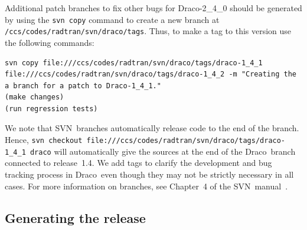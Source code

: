 \documentclass[note]{newmemo}
\newcommand{\draco}{{\normalfont\small\sffamily Draco}}
\newcommand{\svn}{\textsf{SVN}}
\begin{document}
Additional patch branches to fix other bugs for \draco-2\_4\_0 should
be generated by using the \texttt{svn copy} command to create a new
branch at \texttt{/ccs/codes/radtran/svn/draco/tags}.  Thus, to
make a tag to this version use the following commands:
\begin{lstlisting}[basicstyle=\footnotesize, xleftmargin=2.0in, 
  xrightmargin=2.0in]
svn copy file:///ccs/codes/radtran/svn/draco/tags/draco-1_4_1 file:///ccs/codes/radtran/svn/draco/tags/draco-1_4_2 -m "Creating the a branch for a patch to Draco-1_4_1."
(make changes)
(run regression tests)
\end{lstlisting}
We note that \svn\ branches automatically release code to the end of
the branch.  Hence, \texttt{svn checkout
  file:///ccs/codes/radtran/svn/draco/tags/draco-1\_4\_1 draco} will
automatically give the sources at the end of the \draco\ branch
connected to release~1.4.  We add tags to clarify the development and
bug tracking process in \draco\ even though they may not be strictly
necessary in all cases.  For more information on branches, see
Chapter~4 of the \svn\ manual~\cite{svn-redbean}.


\subsection{Generating the release}
\label{sec:generating_release}
\end{document}
